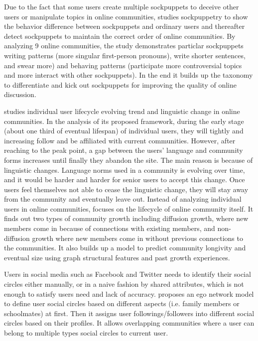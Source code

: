 Due to the fact that some users create multiple sockpuppets to deceive other users or manipulate topics in online communities, \cite{kumar2017army} studies sockpuppetry to show the behavior difference between sockpuppets and ordinary users and thereafter detect sockpuppets to maintain the correct order of online communities. By analyzing 9 online communities, the study demonstrates particlar sockpuppets writing patterns (more singular first-person pronouns), write shorter sentences, and swear more) and behaving patterns (participate more controversial topics and more interact with other sockpuppets). In the end it builds up the taxonomy to differentiate and kick out sockpuppets for improving the quality of online discussion.


\cite{danescu2013no} studies individual user lifecycle evolving trend and linguistic change in online communities. In the analysis of its proposed framework, during the early stage (about one third of eventual lifespan) of individual users, they will tightly and increasing follow and be affiliated with current communities. However, after reaching to the peak point, a gap between the users'  language and community forms increases until finally they abandon the site. The main reason is because of linguistic changes. Language norms used in a community is evolving over time, and it would be harder and harder for senior users to accept this change. Once users feel themselves not able to cease the linguistic change, they will stay away from the community and eventually leave out.  Instead of analyzing individual users in online communities, \cite{kairam2012life} focuses on the lifecycle of online community itself. It finds out two types of community growth including diffusion growth,  where new members come in because of connections with existing members, and non-diffusion growth where new members come in without previous connections to the communities. It also builds up a model to predict community longivity and eventual size using graph structural features and past growth experiences. 

Users in social media such as Facebook and Twitter needs to identify their social circles either manually, or in a naive fashion by shared attributes, which is not enough to satisfy users need and lack of accuracy.  \cite{leskovec2012learning}  proposes an ego network model to define user social circles based on different aspects (i.e. family members or schoolmates) at first. Then it assigns user followings/followers into different social circles based on their profiles. It allows overlapping communities where a user can belong to multiple types social circles to current user.


